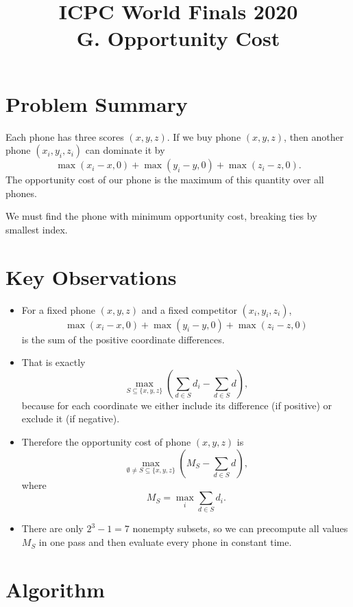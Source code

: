 \documentclass[11pt]{article}
\title{ICPC World Finals 2020\\G. Opportunity Cost}
\author{}
\date{}
\begin{document}
\maketitle

\section*{Problem Summary}

Each phone has three scores $(x,y,z)$.
If we buy phone $(x,y,z)$, then another phone $(x_i,y_i,z_i)$ can dominate it by
\[
    \max(x_i-x,0)+\max(y_i-y,0)+\max(z_i-z,0).
\]
The opportunity cost of our phone is the maximum of this quantity over all phones.

We must find the phone with minimum opportunity cost, breaking ties by smallest index.

\section*{Key Observations}

\begin{itemize}[leftmargin=*]
    \item For a fixed phone $(x,y,z)$ and a fixed competitor $(x_i,y_i,z_i)$,
    \[
        \max(x_i-x,0)+\max(y_i-y,0)+\max(z_i-z,0)
    \]
    is the sum of the positive coordinate differences.
    \item That is exactly
    \[
        \max_{S \subseteq \{x,y,z\}}
        \left( \sum_{d \in S} d_i - \sum_{d \in S} d \right),
    \]
    because for each coordinate we either include its difference (if positive) or exclude it (if negative).
    \item Therefore the opportunity cost of phone $(x,y,z)$ is
    \[
        \max_{\emptyset \ne S \subseteq \{x,y,z\}}
        \left( M_S - \sum_{d \in S} d \right),
    \]
    where
    \[
        M_S = \max_i \sum_{d \in S} d_i.
    \]
    \item There are only $2^3-1=7$ nonempty subsets, so we can precompute all values $M_S$ in one pass and
    then evaluate every phone in constant time.
\end{itemize}

\section*{Algorithm}
\end{document}

